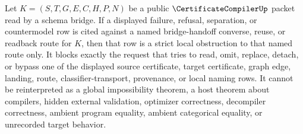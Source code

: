 \begin{corollary}
\label{cor:certificate-compiler-bridge-schema-handoff-strict-obstruction}
Let $K=(S,T,G,E,C,H,P,N)$ be a public $\CertificateCompilerUp$ packet read by a schema bridge. If a displayed failure, refusal, separation, or countermodel row is cited against a named bridge-handoff converse, reuse, or readback route for $K$, then that row is a strict local obstruction to that named route only. It blocks exactly the request that tries to read, omit, replace, detach, or bypass one of the displayed source certificate, target certificate, graph edge, landing, route, classifier-transport, provenance, or local naming rows. It cannot be reinterpreted as a global impossibility theorem, a host theorem about compilers, hidden external validation, optimizer correctness, decompiler correctness, ambient program equality, ambient categorical equality, or unrecorded target behavior.
\end{corollary}
